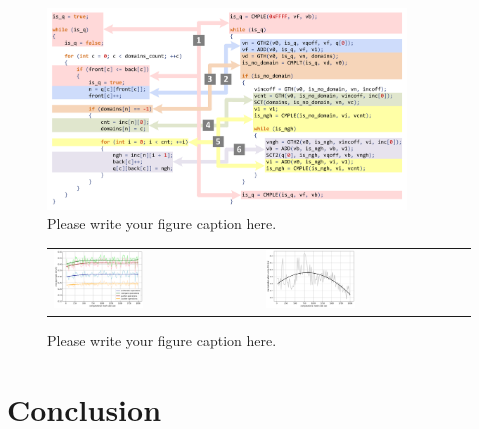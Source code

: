 \documentclass[
11pt,%
tightenlines,%
twoside,%
onecolumn,%
nofloats,%
nobibnotes,%
nofootinbib,%
superscriptaddress,%
noshowpacs,%
centertags]%
{revtex4}
\begin{document}
\begin{figure}[h]
\setcaptionmargin{5mm}
\onelinecaptionstrue  %
\includegraphics[width=0.85\textwidth]{pics/code.pdf}
\caption{Please write your figure caption here.}\label{fig:code}
\end{figure}

\begin{figure}[h]
\setcaptionmargin{5mm}
\onelinecaptionstrue  %
\begin{tabular}{ll}
\includegraphics[width=0.45\textwidth]{pics/chart_statistics_eng.png}
&
\includegraphics[width=0.45\textwidth]{pics/chart_speedup_eng.png}
\end{tabular}
\caption{Please write your figure caption here.}\label{fig:chart_speedup}
\end{figure}

\section{Conclusion}
\end{document}
